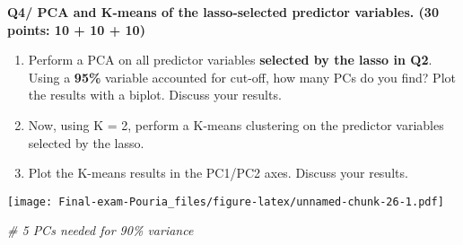 \documentclass[
]{article}
\newenvironment{Shaded}{\begin{snugshade}}{\end{snugshade}}
\newcommand{\AttributeTok}[1]{\textcolor[rgb]{0.77,0.63,0.00}{#1}}
\newcommand{\CommentTok}[1]{\textcolor[rgb]{0.56,0.35,0.01}{\textit{#1}}}
\newcommand{\ConstantTok}[1]{\textcolor[rgb]{0.00,0.00,0.00}{#1}}
\newcommand{\DecValTok}[1]{\textcolor[rgb]{0.00,0.00,0.81}{#1}}
\newcommand{\FunctionTok}[1]{\textcolor[rgb]{0.00,0.00,0.00}{#1}}
\newcommand{\NormalTok}[1]{#1}
\newcommand{\OtherTok}[1]{\textcolor[rgb]{0.56,0.35,0.01}{#1}}
\newcommand{\SpecialCharTok}[1]{\textcolor[rgb]{0.00,0.00,0.00}{#1}}
\newcommand{\StringTok}[1]{\textcolor[rgb]{0.31,0.60,0.02}{#1}}
\begin{document}
\textbf{Q4/ PCA and K-means of the lasso-selected predictor variables.
(30 points: 10 + 10 + 10)}

\begin{enumerate}
\def\labelenumi{\arabic{enumi}.}
\item
  Perform a PCA on all predictor variables \textbf{selected by the lasso
  in Q2}. Using a \textbf{95\%} variable accounted for cut-off, how many
  PCs do you find? Plot the results with a biplot. Discuss your results.
\item
  Now, using K = 2, perform a K-means clustering on the predictor
  variables selected by the lasso.
\item
  Plot the K-means results in the PC1/PC2 axes. Discuss your results.
\end{enumerate}

\begin{Shaded}
\end{Shaded}

\texttt{[image: Final-exam-Pouria\_files/figure-latex/unnamed-chunk-26-1.pdf]}

\begin{Shaded}
\begin{Highlighting}[]
\CommentTok{\# 5 PCs needed for 90\% variance}
\end{Highlighting}
\end{Shaded}
\end{document}
